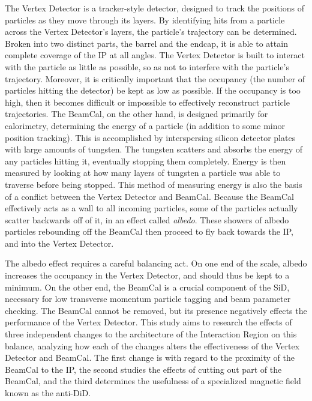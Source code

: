 \documentclass{report}
\begin{document}
                The Vertex Detector is a tracker-style detector, designed to track the positions of particles as they move through its layers. By identifying hits from a particle across the Vertex Detector's layers, the particle's trajectory can be determined. Broken into two distinct parts, the barrel and the endcap, it is able to attain complete coverage of the IP at all angles. The Vertex Detector is built to interact with the particle as little as possible, so as not to interfere with the particle's trajectory. Moreover, it is critically important that the occupancy (the number of particles hitting the detector) be kept as low as possible. If the occupancy is too high, then it becomes difficult or impossible to effectively reconstruct particle trajectories. The BeamCal, on the other hand, is designed primarily for calorimetry, determining the energy of a particle (in addition to some minor position tracking). This is accomplished by interspersing silicon detector plates with large amounts of tungsten. The tungsten scatters and absorbs the energy of any particles hitting it, eventually stopping them completely. Energy is then measured by looking at how many layers of tungsten a particle was able to traverse before being stopped. This method of measuring energy is also the basis of a conflict between the Vertex Detector and BeamCal. Because the BeamCal effectively acts as a wall to all incoming particles, some of the particles actually scatter backwards off of it, in an effect called \textit{albedo}. These showers of albedo particles rebounding off the BeamCal then proceed to fly back towards the IP, and into the Vertex Detector.
                
                The albedo effect requires a careful balancing act. On one end of the scale, albedo increases the occupancy in the Vertex Detector, and should thus be kept to a minimum. On the other end, the BeamCal is a crucial component of the SiD, necessary for low transverse momentum particle tagging and beam parameter checking. The BeamCal cannot be removed, but its presence negatively effects the performance of the Vertex Detector. This study aims to research the effects of three independent changes to the architecture of the Interaction Region on this balance, analyzing how each of the changes alters the effectiveness of the Vertex Detector and BeamCal. The first change is with regard to the proximity of the BeamCal to the IP, the second studies the effects of cutting out part of the BeamCal, and the third determines the usefulness of a specialized magnetic field known as the anti-DiD.
\end{document}
